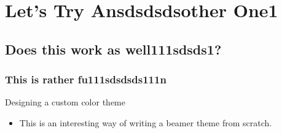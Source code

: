\section{Let's Try Ansdsdsdsother One1}
\subsection{Does this work as well111sdsds1?}
\subsubsection{This is rather fu111sdsdsds111n}
\begin{frame}{Designing a custom color theme}
\begin{itemize}
\item{This is an interesting way of writing a beamer theme from scratch.}
\end{itemize}
\end{frame}
